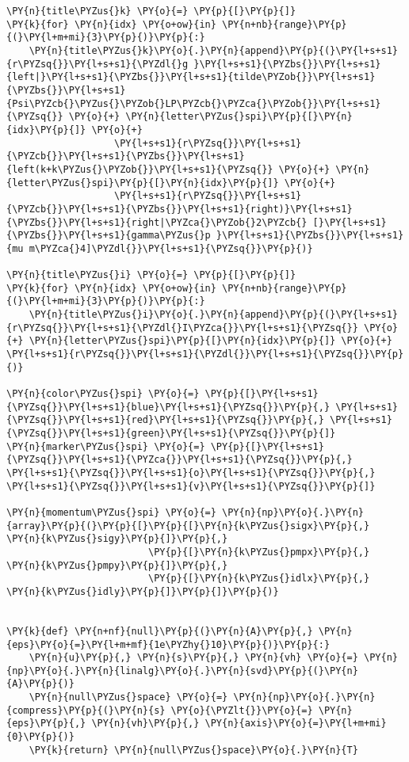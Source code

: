 \begin{Verbatim}[commandchars=\\\{\}]
\PY{n}{title\PYZus{}k} \PY{o}{=} \PY{p}{[}\PY{p}{]}
\PY{k}{for} \PY{n}{idx} \PY{o+ow}{in} \PY{n+nb}{range}\PY{p}{(}\PY{l+m+mi}{3}\PY{p}{)}\PY{p}{:}
    \PY{n}{title\PYZus{}k}\PY{o}{.}\PY{n}{append}\PY{p}{(}\PY{l+s+s1}{r\PYZsq{}}\PY{l+s+s1}{\PYZdl{}g }\PY{l+s+s1}{\PYZbs{}}\PY{l+s+s1}{left|}\PY{l+s+s1}{\PYZbs{}}\PY{l+s+s1}{tilde\PYZob{}}\PY{l+s+s1}{\PYZbs{}}\PY{l+s+s1}{Psi\PYZcb{}\PYZus{}\PYZob{}LP\PYZcb{}\PYZca{}\PYZob{}}\PY{l+s+s1}{\PYZsq{}} \PY{o}{+} \PY{n}{letter\PYZus{}spi}\PY{p}{[}\PY{n}{idx}\PY{p}{]} \PY{o}{+}
                   \PY{l+s+s1}{r\PYZsq{}}\PY{l+s+s1}{\PYZcb{}}\PY{l+s+s1}{\PYZbs{}}\PY{l+s+s1}{left(k+k\PYZus{}\PYZob{}}\PY{l+s+s1}{\PYZsq{}} \PY{o}{+} \PY{n}{letter\PYZus{}spi}\PY{p}{[}\PY{n}{idx}\PY{p}{]} \PY{o}{+}
                   \PY{l+s+s1}{r\PYZsq{}}\PY{l+s+s1}{\PYZcb{}}\PY{l+s+s1}{\PYZbs{}}\PY{l+s+s1}{right)}\PY{l+s+s1}{\PYZbs{}}\PY{l+s+s1}{right|\PYZca{}\PYZob{}2\PYZcb{} [}\PY{l+s+s1}{\PYZbs{}}\PY{l+s+s1}{gamma\PYZus{}p }\PY{l+s+s1}{\PYZbs{}}\PY{l+s+s1}{mu m\PYZca{}4]\PYZdl{}}\PY{l+s+s1}{\PYZsq{}}\PY{p}{)}

\PY{n}{title\PYZus{}i} \PY{o}{=} \PY{p}{[}\PY{p}{]}
\PY{k}{for} \PY{n}{idx} \PY{o+ow}{in} \PY{n+nb}{range}\PY{p}{(}\PY{l+m+mi}{3}\PY{p}{)}\PY{p}{:}
    \PY{n}{title\PYZus{}i}\PY{o}{.}\PY{n}{append}\PY{p}{(}\PY{l+s+s1}{r\PYZsq{}}\PY{l+s+s1}{\PYZdl{}I\PYZca{}}\PY{l+s+s1}{\PYZsq{}} \PY{o}{+} \PY{n}{letter\PYZus{}spi}\PY{p}{[}\PY{n}{idx}\PY{p}{]} \PY{o}{+} \PY{l+s+s1}{r\PYZsq{}}\PY{l+s+s1}{\PYZdl{}}\PY{l+s+s1}{\PYZsq{}}\PY{p}{)}

\PY{n}{color\PYZus{}spi} \PY{o}{=} \PY{p}{[}\PY{l+s+s1}{\PYZsq{}}\PY{l+s+s1}{blue}\PY{l+s+s1}{\PYZsq{}}\PY{p}{,} \PY{l+s+s1}{\PYZsq{}}\PY{l+s+s1}{red}\PY{l+s+s1}{\PYZsq{}}\PY{p}{,} \PY{l+s+s1}{\PYZsq{}}\PY{l+s+s1}{green}\PY{l+s+s1}{\PYZsq{}}\PY{p}{]}
\PY{n}{marker\PYZus{}spi} \PY{o}{=} \PY{p}{[}\PY{l+s+s1}{\PYZsq{}}\PY{l+s+s1}{\PYZca{}}\PY{l+s+s1}{\PYZsq{}}\PY{p}{,} \PY{l+s+s1}{\PYZsq{}}\PY{l+s+s1}{o}\PY{l+s+s1}{\PYZsq{}}\PY{p}{,} \PY{l+s+s1}{\PYZsq{}}\PY{l+s+s1}{v}\PY{l+s+s1}{\PYZsq{}}\PY{p}{]}

\PY{n}{momentum\PYZus{}spi} \PY{o}{=} \PY{n}{np}\PY{o}{.}\PY{n}{array}\PY{p}{(}\PY{p}{[}\PY{p}{[}\PY{n}{k\PYZus{}sigx}\PY{p}{,} \PY{n}{k\PYZus{}sigy}\PY{p}{]}\PY{p}{,}
                         \PY{p}{[}\PY{n}{k\PYZus{}pmpx}\PY{p}{,} \PY{n}{k\PYZus{}pmpy}\PY{p}{]}\PY{p}{,}
                         \PY{p}{[}\PY{n}{k\PYZus{}idlx}\PY{p}{,} \PY{n}{k\PYZus{}idly}\PY{p}{]}\PY{p}{]}\PY{p}{)}


\PY{k}{def} \PY{n+nf}{null}\PY{p}{(}\PY{n}{A}\PY{p}{,} \PY{n}{eps}\PY{o}{=}\PY{l+m+mf}{1e\PYZhy{}10}\PY{p}{)}\PY{p}{:}
    \PY{n}{u}\PY{p}{,} \PY{n}{s}\PY{p}{,} \PY{n}{vh} \PY{o}{=} \PY{n}{np}\PY{o}{.}\PY{n}{linalg}\PY{o}{.}\PY{n}{svd}\PY{p}{(}\PY{n}{A}\PY{p}{)}
    \PY{n}{null\PYZus{}space} \PY{o}{=} \PY{n}{np}\PY{o}{.}\PY{n}{compress}\PY{p}{(}\PY{n}{s} \PY{o}{\PYZlt{}}\PY{o}{=} \PY{n}{eps}\PY{p}{,} \PY{n}{vh}\PY{p}{,} \PY{n}{axis}\PY{o}{=}\PY{l+m+mi}{0}\PY{p}{)}
    \PY{k}{return} \PY{n}{null\PYZus{}space}\PY{o}{.}\PY{n}{T}



\end{Verbatim}
